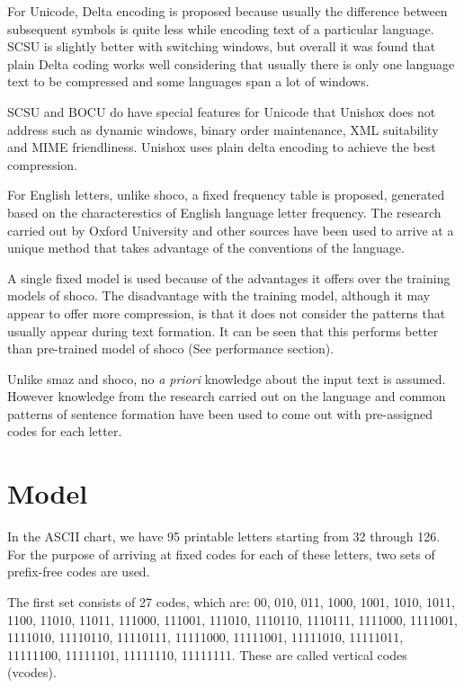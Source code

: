 \documentclass[]{article}
\begin{document}
For Unicode, Delta encoding is proposed because usually the difference between subsequent symbols is quite less while encoding text of a particular language. SCSU is slightly better with switching windows, but overall it was found that plain Delta coding works well considering that usually there is only one language text to be compressed and some languages span a lot of windows.

SCSU and BOCU do have special features for Unicode that Unishox does not address such as dynamic windows, binary order maintenance, XML suitability and MIME friendliness. Unishox uses plain delta encoding to achieve the best compression.

For English letters, unlike shoco, a fixed frequency table is proposed, generated based on the characterestics of English language letter frequency. The research carried out by Oxford University \cite{7} and other sources \cite{7} \cite{9} have been used to arrive at a unique method that takes advantage of the conventions of the language.

A single fixed model is used because of the advantages it offers over the training models of shoco. The disadvantage with the training model, although it may appear to offer more compression, is that it does not consider the patterns that usually appear during text formation. It can be seen that this performs better than pre-trained model of shoco (See performance section).

Unlike smaz and shoco, no \emph{a priori} knowledge about the input text is assumed. However knowledge from the research carried out on the language and common patterns of sentence formation have been used to come out with pre-assigned codes for each letter.

\section{Model}

In the ASCII chart, we have 95 printable letters starting from 32 through 126. For the purpose of arriving at fixed codes for each of these letters, two sets of prefix-free codes are used.

The first set consists of 27 codes, which are: 00, 010, 011, 1000, 1001, 1010, 1011, 1100, 11010, 11011, 111000, 111001, 111010, 1110110, 1110111, 1111000, 1111001, 1111010, 11110110, 11110111, 11111000, 11111001, 11111010, 11111011, 11111100, 11111101, 11111110, 11111111. These are called vertical codes (vcodes).
\end{document}
